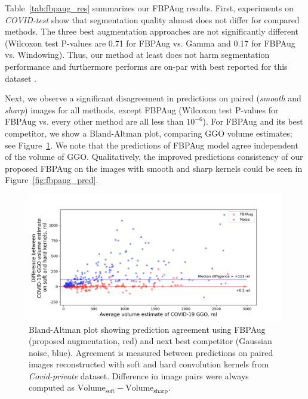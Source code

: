Table~\ref{tab:fbpaug_res} summarizes our FBPAug results. First, experiments on \textit{COVID-test} show that segmentation quality almost does not differ for compared methods. The three best augmentation approaches are not significantly different (Wilcoxon test P-values are 0.71 for FBPAug vs. Gamma and 0.17 for FBPAug vs. Windowing). Thus, our method at least does not harm segmentation performance and furthermore performs are on-par with best reported for this dataset \cite{goncharov2021ct}.



Next, we observe a significant disagreement in predictions on paired (\textit{smooth} and \textit{sharp}) images for all methods, except FBPAug (Wilcoxon test P-values for FBPAug vs. every other method are all less than $10^{-6}$). For FBPAug and its best competitor, we show a Bland-Altman plot, comparing GGO volume estimates; see Figure~\ref{fig:bland-altman}. We note that the predictions of FBPAug model agree independent of the volume of GGO. Qualitatively, the improved predictions consistency of our proposed FBPAug on the images with smooth and sharp kernels could be seen in Figure~\ref{fig:fbpaug_pred}.

\begin{figure}[h]
	\centering
	\includegraphics[width=\textwidth]{Dissertation/Figures/3_ct/bland-altman.png}
	\caption{Bland-Altman plot showing prediction agreement using FBPAug (proposed augmentation, red) and next best competitor (Gaussian noise, blue). Agreement is measured between predictions on paired images reconstructed with soft and hard convolution kernels from \textit{Covid-private} dataset. Difference in image pairs were always computed as $\text{Volume}_{\text{soft}} - \text{Volume}_{\text{sharp}}$.}
	\label{fig:bland-altman}
\end{figure}

